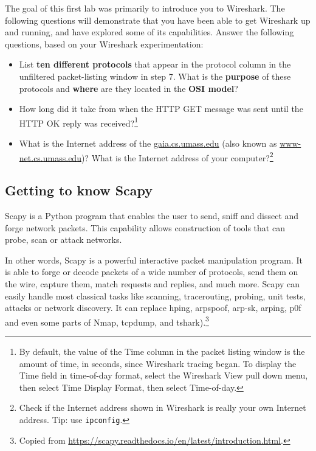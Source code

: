 \documentclass[11pt,a4paper]{article}
\begin{document}
The goal of this first lab was primarily to introduce you to Wireshark. The following
questions will demonstrate that you have been able to get Wireshark up and running, and
have explored some of its capabilities. Answer the following questions, based on your
Wireshark experimentation:
\begin{itemize}
	\item List \textbf{ten different protocols} that appear in the protocol column in the unfiltered
	packet-listing window in step 7. What is the \textbf{purpose} of these protocols and \textbf{where} are they located in the \textbf{OSI model}?

	\item How long did it take from when the HTTP GET message was sent until the HTTP
	OK reply was received?\footnote{By default, the value of the Time column in the packet listing
		window is the amount of time, in seconds, since Wireshark tracing began.
		To display the Time field in time-of-day format, select the Wireshark View pull
		down menu, then select Time Display Format, then select Time-of-day.}

	\item What is the Internet address of the \url{gaia.cs.umass.edu} (also known as \url{www-net.cs.umass.edu})? What is the Internet address of your computer?\footnote{Check if the Internet address shown in Wireshark is really your own Internet address. Tip: use \texttt{ipconfig}.}
\end{itemize}



\subsection{Getting to know Scapy}
Scapy is a Python program that enables the user to send, sniff and dissect and forge network packets. This capability allows construction of tools that can probe, scan or attack networks.

In other words, Scapy is a powerful interactive packet manipulation program. It is able to forge or decode packets of a wide number of protocols, send them on the wire, capture them, match requests and replies, and much more. Scapy can easily handle most classical tasks like scanning, tracerouting, probing, unit tests, attacks or network discovery. It can replace hping, arpspoof, arp-sk, arping, p0f and even some parts of Nmap, tcpdump, and tshark).\footnote{Copied from \url{https://scapy.readthedocs.io/en/latest/introduction.html}.}
\end{document}
